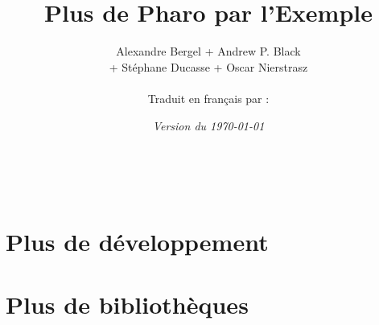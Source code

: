 \documentclass[a4paper,10pt,twoside]{book}
\begin{document}
\frontmatter
\setcounter{page}{1}
\pagestyle{headings}
\author{
  Alexandre Bergel\quad
+	Andrew P. Black\\[1ex]
+	St\'ephane Ducasse\quad
+	Oscar Nierstrasz\quad
  
	\\[4ex]
Traduit en fran\c{c}ais par :\\[2ex]
	}
\title{\Huge\bf Plus de Pharo par l'Exemple\\[1ex]} %
\numdate
{}
\date{\emph{Version du \today}}
\maketitle
~ %


\pagestyle{newheadings}
\tableofcontents
\sloppy %

\mainmatter
\part{Plus de développement}
\pagestyle{headings}

% 
% 
% 

\part{Plus de bibliothèques}
% 


\end{document}
